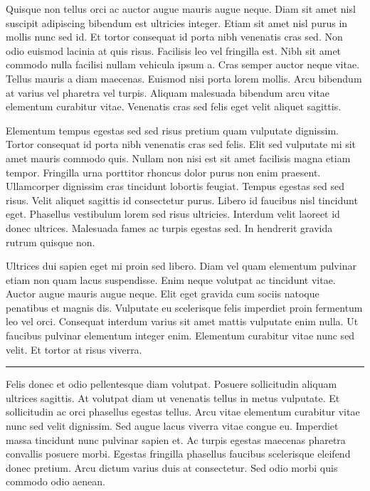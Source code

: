 \documentclass[10pt]{article} %
\newenvironment{BoxedInternal}[1][]
{%
  \begin{changemargin}{0cm}{0cm}%
    \begin{mdframed}[roundcorner=5pt,backgroundcolor=swred,outermargin  =-0.5in,innermargin =-0.5in, topline=false, bottomline=false, rightline=false, leftline=false,#1]
    }{%
    \end{mdframed}%
  \end{changemargin}%
}
\newcommand*{\noind}{\setlength{\parindent}{0cm}} %
\newcommand{\bighdr}[2][]{%
  \vspace{2pt}
  \begin{BoxedInternal}[#1]{}
    \color{white}\huge\bfseries\headingfont\filcenter{#2}
  \end{BoxedInternal}\vspace{-8pt}%
}
\newcommand{\medhdr}[1][]{%
	{\noind{\Large\bfseries\headingfont{#1}}}
	\vspace{-9pt}

	\noindent\rule{2.75in}{2pt} %
}
\newcommand{\smlhdr}[1][]{%
	{\noind{\large\bfseries\headingfont{#1}}}
}
\begin{document}
\begin{multicols}{2}
  \smlhdr[SMALLER SECTION] %

  {\noind
    Quisque non tellus orci ac auctor augue mauris augue neque. Diam sit amet nisl suscipit adipiscing bibendum est ultricies integer. Etiam sit amet nisl purus in mollis nunc sed id. Et tortor consequat id porta nibh venenatis cras sed. Non odio euismod lacinia at quis risus. Facilisis leo vel fringilla est. Nibh sit amet commodo nulla facilisi nullam vehicula ipsum a. Cras semper auctor neque vitae. Tellus mauris a diam maecenas. Euismod nisi porta lorem mollis. Arcu bibendum at varius vel pharetra vel turpis. Aliquam malesuada bibendum arcu vitae elementum curabitur vitae. Venenatis cras sed felis eget velit aliquet sagittis.
  }

  \bighdr{COOL STUFF}
  {\noind
    Elementum tempus egestas sed sed risus pretium quam vulputate dignissim. Tortor consequat id porta nibh venenatis cras sed felis. Elit sed vulputate mi sit amet mauris commodo quis. Nullam non nisi est sit amet facilisis magna etiam tempor. Fringilla urna porttitor rhoncus dolor purus non enim praesent. Ullamcorper dignissim cras tincidunt lobortis feugiat. Tempus egestas sed sed risus. Velit aliquet sagittis id consectetur purus. Libero id faucibus nisl tincidunt eget. Phasellus vestibulum lorem sed risus ultricies. Interdum velit laoreet id donec ultrices. Malesuada fames ac turpis egestas sed. In hendrerit gravida rutrum quisque non.
  }

  Ultrices dui sapien eget mi proin sed libero. Diam vel quam elementum pulvinar etiam non quam lacus suspendisse. Enim neque volutpat ac tincidunt vitae. Auctor augue mauris augue neque. Elit eget gravida cum sociis natoque penatibus et magnis dis. Vulputate eu scelerisque felis imperdiet proin fermentum leo vel orci. Consequat interdum varius sit amet mattis vulputate enim nulla. Ut faucibus pulvinar elementum integer enim. Elementum curabitur vitae nunc sed velit. Et tortor at risus viverra.\\

  \medhdr[ANOTHER SMALL SECTION]
  {\noind
    Felis donec et odio pellentesque diam volutpat. Posuere sollicitudin aliquam ultrices sagittis. At volutpat diam ut venenatis tellus in metus vulputate. Et sollicitudin ac orci phasellus egestas tellus. Arcu vitae elementum curabitur vitae nunc sed velit dignissim. Sed augue lacus viverra vitae congue eu. Imperdiet massa tincidunt nunc pulvinar sapien et. Ac turpis egestas maecenas pharetra convallis posuere morbi. Egestas fringilla phasellus faucibus scelerisque eleifend donec pretium. Arcu dictum varius duis at consectetur. Sed odio morbi quis commodo odio aenean.
  }


\end{multicols}
\end{document}
